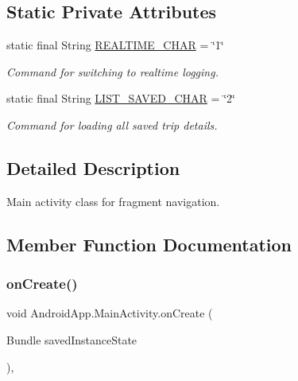 \subsection*{Static Private Attributes}
\begin{DoxyCompactItemize}
\item 
\mbox{\label{class_android_app_1_1_main_activity_a5b01be4fe68777c22779415e54432a79}} 
static final String \hyperlink{class_android_app_1_1_main_activity_a5b01be4fe68777c22779415e54432a79}{R\+E\+A\+L\+T\+I\+M\+E\+\_\+\+C\+H\+AR} = \char`\"{}1\char`\"{}
\begin{DoxyCompactList}\small\item\em Command for switching to realtime logging. \end{DoxyCompactList}\item 
\mbox{\label{class_android_app_1_1_main_activity_a559f123628c037642baa46b37f23f5cc}} 
static final String \hyperlink{class_android_app_1_1_main_activity_a559f123628c037642baa46b37f23f5cc}{L\+I\+S\+T\+\_\+\+S\+A\+V\+E\+D\+\_\+\+C\+H\+AR} = \char`\"{}2\char`\"{}
\begin{DoxyCompactList}\small\item\em Command for loading all saved trip details. \end{DoxyCompactList}\end{DoxyCompactItemize}


\subsection{Detailed Description}
Main activity class for fragment navigation. 

\subsection{Member Function Documentation}
\mbox{\label{class_android_app_1_1_main_activity_a2b1390dea8035d3802067ceb6ba5ebbd}} 
\subsubsection{\texorpdfstring{on\+Create()}{onCreate()}}
{\footnotesize\ttfamily void Android\+App.\+Main\+Activity.\+on\+Create (\begin{DoxyParamCaption}\item[{Bundle}]{saved\+Instance\+State }\end{DoxyParamCaption})\hspace{0.3cm}{\ttfamily [inline]}, {\ttfamily [protected]}}



